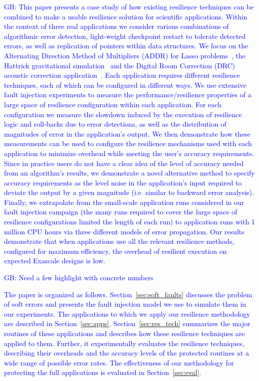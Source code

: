 \documentclass{sig-alternate}
\newcommand{\greg}[1]{%
  \textcolor{blue}{GB: #1}
}
\begin{document}
\greg{
This paper presents a case study of how existing resilience techniques can be combined to make a usable resilience solution for scientific applications.
Within the context of three real applications we consider various combinations of algorithmic error detection, light-weight checkpoint restart to tolerate detected errors, as well as replication of pointers within data structures.
We focus on the Alternating Direction Method of Multipliers (ADDR) for Lasso problems~\cite{lasso:2011}, the Hattrick gravitational simulation~\cite{hattrick:2012} and the Digital Room Correction (DRC) acoustic correction application~\cite{drc:2012}.
Each application requires different resilience techniques, each of which can be configured in different ways.
We use extensive fault injection experiments to measure the performance/resilience properties of a large space of resilience configuration within each application.
For each configuration we measure the slowdown induced by the execution of resilience logic and roll-backs due to error detections, as well as the distribution of magnitudes of error in the application's output.
We then demonstrate how these measurements can be used to configure the resilience mechanisms used with each application to minimize overhead while meeting the user's accuracy requirements.
Since in practice users do not have a clear idea of the level of accuracy needed from an algorithm's results, we demonstrate a novel alternative method to specify accuracy requirements as the level noise in the application's input required to deviate the output by a given magnitude (i.e. similar to backward error analysis).
Finally, we extrapolate from the small-scale application runs considered in our fault injection campaign (the many runs required to cover the large space of resilience configurations limited the length of each run) to application runs with 1 million CPU hours via three different models of error propagation.
Our results demonstrate that when applications use all the relevant resilience methods, configured for maximum efficiency, the overhead of resilient execution on expected Exascale designs is low.

\greg{Need a few highlight with concrete numbers}

The paper is organized as follows.
Section~\ref{sec:soft_faults} discusses the problem of soft errors and presents the fault injection model we use to simulate them in our experiments.
The applications to which we apply our resilience methodology are described in Section~\ref{sec:apps}.
Section~\ref{sec:res_tech} summarizes the major routines of these applications and describes how these resilience techniques are applied to them.
Further, it experimentally evaluates the resilience techniques, describing their overheads and the accuracy levels of the protected routines at a wide range of possible error rates.
The effectiveness of our methodology for protecting the full applications is evaluated in Section~\ref{sec:eval}.

}
\end{document}
